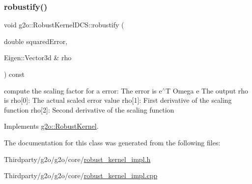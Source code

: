 \subsubsection{\texorpdfstring{robustify()}{robustify()}}
{\footnotesize\ttfamily void g2o\+::\+Robust\+Kernel\+D\+C\+S\+::robustify (\begin{DoxyParamCaption}\item[{double}]{squared\+Error,  }\item[{Eigen\+::\+Vector3d \&}]{rho }\end{DoxyParamCaption}) const\hspace{0.3cm}{\ttfamily [virtual]}}

compute the scaling factor for a error\+: The error is e$^\wedge$T Omega e The output rho is rho\mbox{[}0\mbox{]}\+: The actual scaled error value rho\mbox{[}1\mbox{]}\+: First derivative of the scaling function rho\mbox{[}2\mbox{]}\+: Second derivative of the scaling function 

Implements \mbox{\hyperlink{classg2o_1_1_robust_kernel_ab47b071a0cfe466be063f0104bc41d0f}{g2o\+::\+Robust\+Kernel}}.



The documentation for this class was generated from the following files\+:\begin{DoxyCompactItemize}
\item 
Thirdparty/g2o/g2o/core/\mbox{\hyperlink{robust__kernel__impl_8h}{robust\+\_\+kernel\+\_\+impl.\+h}}\item 
Thirdparty/g2o/g2o/core/\mbox{\hyperlink{robust__kernel__impl_8cpp}{robust\+\_\+kernel\+\_\+impl.\+cpp}}\end{DoxyCompactItemize}
